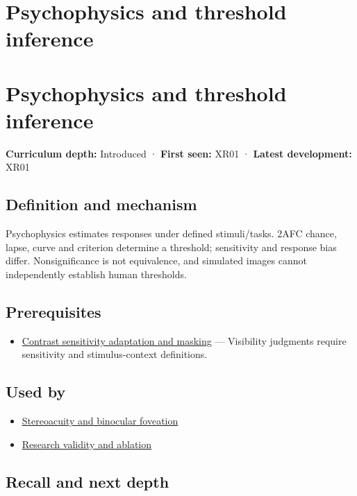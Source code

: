 \hypertarget{appendix-1759f03e8ce7}{}
\section*{Psychophysics and threshold inference}
\section{Psychophysics and threshold inference}\label{psychophysics-and-threshold-inference}

\textbf{Curriculum depth:} Introduced · \textbf{First seen:} XR01 · \textbf{Latest development:} XR01

\subsection{Definition and mechanism}\label{definition-and-mechanism}

Psychophysics estimates responses under defined stimuli/tasks. 2AFC chance, lapse, curve and criterion determine a threshold; sensitivity and response bias differ. Nonsignificance is not equivalence, and simulated images cannot independently establish human thresholds.

\subsection{Prerequisites}\label{prerequisites}

\begin{itemize}
\tightlist
\item
  \hyperref[appendix-b3aa9e8e01ad]{Contrast sensitivity adaptation and masking} --- Visibility judgments require sensitivity and stimulus-context definitions.
\end{itemize}

\subsection{Used by}\label{used-by}

\begin{itemize}
\tightlist
\item
  \hyperref[appendix-8dc848f14052]{Stereoacuity and binocular foveation}
\item
  \hyperref[appendix-65788587ef78]{Research validity and ablation}
\end{itemize}

\subsection{Recall and next depth}\label{recall-and-next-depth}

